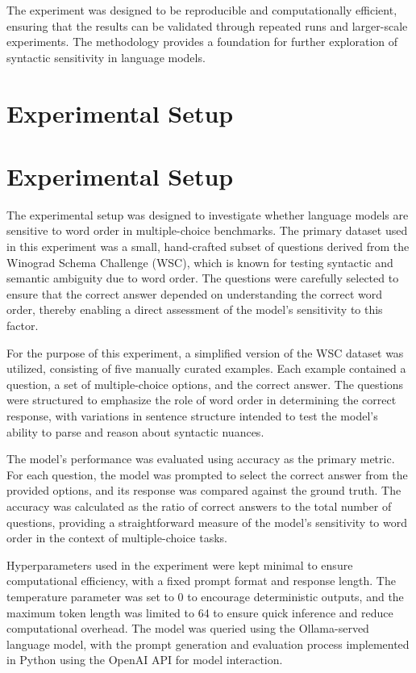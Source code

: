 \documentclass{article}
\begin{document}
The experiment was designed to be reproducible and computationally efficient, ensuring that the results can be validated through repeated runs and larger-scale experiments. The methodology provides a foundation for further exploration of syntactic sensitivity in language models.
\section{Experimental Setup}
\section*{Experimental Setup}

The experimental setup was designed to investigate whether language models are sensitive to word order in multiple-choice benchmarks. The primary dataset used in this experiment was a small, hand-crafted subset of questions derived from the Winograd Schema Challenge (WSC), which is known for testing syntactic and semantic ambiguity due to word order. The questions were carefully selected to ensure that the correct answer depended on understanding the correct word order, thereby enabling a direct assessment of the model's sensitivity to this factor.

For the purpose of this experiment, a simplified version of the WSC dataset was utilized, consisting of five manually curated examples. Each example contained a question, a set of multiple-choice options, and the correct answer. The questions were structured to emphasize the role of word order in determining the correct response, with variations in sentence structure intended to test the model's ability to parse and reason about syntactic nuances.

The model's performance was evaluated using accuracy as the primary metric. For each question, the model was prompted to select the correct answer from the provided options, and its response was compared against the ground truth. The accuracy was calculated as the ratio of correct answers to the total number of questions, providing a straightforward measure of the model's sensitivity to word order in the context of multiple-choice tasks.

Hyperparameters used in the experiment were kept minimal to ensure computational efficiency, with a fixed prompt format and response length. The temperature parameter was set to 0 to encourage deterministic outputs, and the maximum token length was limited to 64 to ensure quick inference and reduce computational overhead. The model was queried using the Ollama-served language model, with the prompt generation and evaluation process implemented in Python using the OpenAI API for model interaction.
\end{document}
